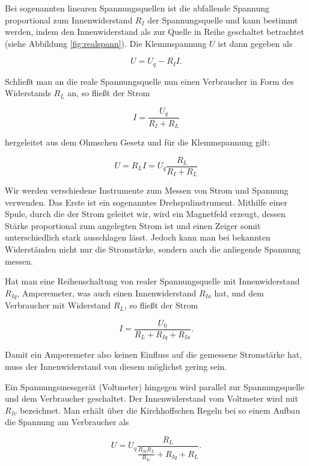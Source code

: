 \documentclass{article}
\begin{document}
Bei sogenannten linearen Spannungsquellen ist die abfallende Spannung proportional zum Innenwiderstand $R_I$ der Spannungsquelle und kann bestimmt werden, indem den Innenwiderstand als zur Quelle in Reihe geschaltet betrachtet (siehe Abbildung \ref{fig:realspann}). Die Klemmspannung $U$ ist dann gegeben als

\begin{equation}
    U = U_q - R_I I.
\end{equation}

Schließt man an die reale Spannungsquelle nun einen Verbraucher in Form des Widerstands $R_L$ an, so fließt der Strom

\begin{equation}
    I = \frac{U_q}{R_I + R_L}
\end{equation}

hergeleitet aus dem Ohmschen Gesetz und für die Klemmspannung gilt:

\begin{equation}
    U = R_L I = U_q \frac{R_L}{R_I + R_L}
\end{equation}

Wir werden verschiedene Instrumente zum Messen von Strom und Spannung verwenden. Das Erste ist ein sogenanntes Drehspulinstrument. Mithilfe einer Spule, durch die der Strom geleitet wir, wird ein Magnetfeld erzeugt, dessen Stärke proportional zum angelegten Strom ist und einen Zeiger somit unterschiedlich stark ausschlagen lässt. Jedoch kann man bei bekannten Widerständen nicht nur die Stromstärke, sondern auch die anliegende Spannung messen. 

Hat man eine Reihenschaltung von realer Spannungsquelle mit Innenwiderstand $R_{Iq}$, Amperemeter, was auch einen Innenwiderstand $R_{Ia}$ hat, und dem Verbraucher mit Widerstand $R_L$, so fließt der Strom

\begin{equation}
    I = \frac{U_0}{R_L + R_{Iq} + R_{Ia}}.
\end{equation}

Damit ein Amperemeter also keinen Einfluss auf die gemessene Stromstärke hat, muss der Innenwiderstand von diesem möglichst gering sein.

Ein Spannungsmessgerät (Voltmeter) hingegen wird parallel zur Spannungsquelle und dem Verbraucher geschaltet. Der Innenwiderstand vom Voltmeter wird mit $R_{Iv}$ bezeichnet. Man erhält über die Kirchhoffschen Regeln bei so einem Aufbau die Spannung am Verbraucher als

\begin{equation}
    U = U_q \frac{R_L}{\frac{R_{Iq}R_{L}}{R_{Iv}} + R_{Iq} + R_L}.
\end{equation}
\end{document}
